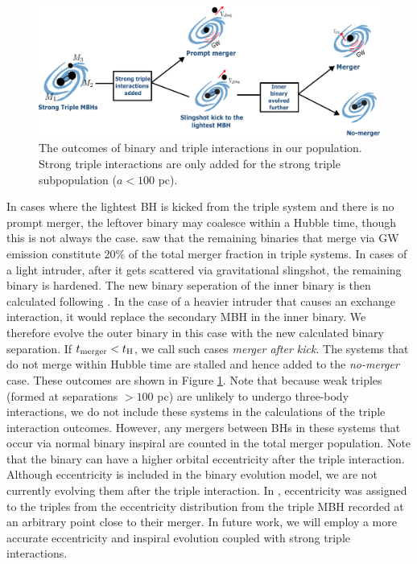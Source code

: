 \documentclass[11pt, letterpaper]{article}
\begin{document}
\begin{figure}
    \centering
    \includegraphics[width=0.9\linewidth]{fig/strong_triple_interactions_outcomes_for_paper.pdf}
    \caption{The outcomes of binary and triple interactions in our population. Strong triple interactions are only added for the strong triple subpopulation ($a<100$ pc).}
    \label{fig:Triple-outcomes}
\end{figure}
In cases where the lightest BH is kicked from the triple system and there is no prompt merger, the leftover binary may coalesce within a Hubble time, though this is not always the case. \citet{bonetti_post-newtonian_2018-1} saw that the remaining binaries that merge via GW emission constitute  20\% %
of the total merger fraction in triple systems. In cases of a light intruder, after it gets scattered via gravitational slingshot, the remaining binary is hardened. The new binary seperation of the inner binary is then calculated following \citet{volonteri_assembly_2003}. In the case of a heavier intruder that causes an exchange interaction, it would replace the secondary MBH in the inner binary. We therefore evolve the outer binary in this case with the new calculated binary separation. If $t_{\rm merger}<t_{\rm H}$, we call such cases \emph{merger after kick}. The systems that do not merge within Hubble time are stalled and hence added to the \emph{no-merger} case. These outcomes are shown in Figure \ref{fig:Triple-outcomes}. Note that because weak triples (formed at separations $>100$ pc) are unlikely to undergo three-body interactions, we do not include these systems in the calculations of the triple interaction outcomes. However, any mergers between BHs in these systems that occur via normal binary inspiral are counted in the total merger population.
Note that the binary can have a higher orbital eccentricity after the triple interaction. Although eccentricity is included in the binary evolution model, we are not currently evolving them after the triple interaction. In \citet{bonetti_post-newtonian_2018}, eccentricity was assigned to the triples from the eccentricity distribution from the triple MBH recorded at an arbitrary point close to their merger. In future work, we will employ a more accurate eccentricity and inspiral evolution coupled with strong triple interactions.
\end{document}
